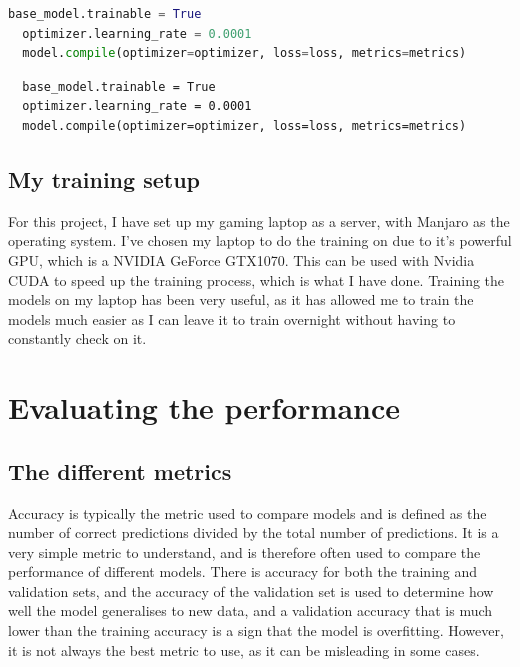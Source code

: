 \documentclass[]{final_report}
\begin{document}
\begin{lstlisting}[language=Python]
  base_model.trainable = True
  optimizer.learning_rate = 0.0001
  model.compile(optimizer=optimizer, loss=loss, metrics=metrics)
\end{lstlisting}

\begin{verbatim}
  base_model.trainable = True
  optimizer.learning_rate = 0.0001
  model.compile(optimizer=optimizer, loss=loss, metrics=metrics)
\end{verbatim}


\section{My training setup}
For this project, I have set up my gaming laptop as a server, with Manjaro\cite{Manjaro} as the operating system.
I've chosen my laptop to do the training on due to it's powerful GPU, which is a NVIDIA GeForce GTX1070\cite{GTX1070}.
This can be used with Nvidia CUDA\cite{CUDA} to speed up the training process, which is what I have done.
Training the models on my laptop has been very useful, as it has allowed me to train the models much easier 
as I can leave it to train overnight without having to constantly check on it.

\chapter{Evaluating the performance}

\section{The different metrics}
Accuracy is typically the metric used to compare models and is defined as the number of correct predictions divided by the total number of predictions.
It is a very simple metric to understand, and is therefore often used to compare the performance of different models.
There is accuracy for both the training and validation sets, and the accuracy of the validation set is used to determine how well the model generalises to new data,
and a validation accuracy that is much lower than the training accuracy is a sign that the model is overfitting.
However, it is not always the best metric to use, as it can be misleading in some cases.
\end{document}
